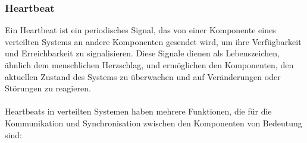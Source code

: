\documentclass[../vs-script-first-v01.tex]{subfiles}
\begin{document}
\subsubsection{Heartbeat}

Ein Heartbeat ist ein periodisches Signal, das von einer Komponente eines verteilten Systems an andere Komponenten gesendet wird, um ihre  Verfügbarkeit und Erreichbarkeit zu signalisieren. Diese Signale dienen als Lebenszeichen, ähnlich dem menschlichen Herzschlag, und ermöglichen den Komponenten, den aktuellen Zustand des Systems zu überwachen und auf Veränderungen oder Störungen zu reagieren.
\\\\
Heartbeats in verteilten Systemen haben mehrere Funktionen, die für die Kommunikation und Synchronisation zwischen den Komponenten von Bedeutung sind:
\end{document}
